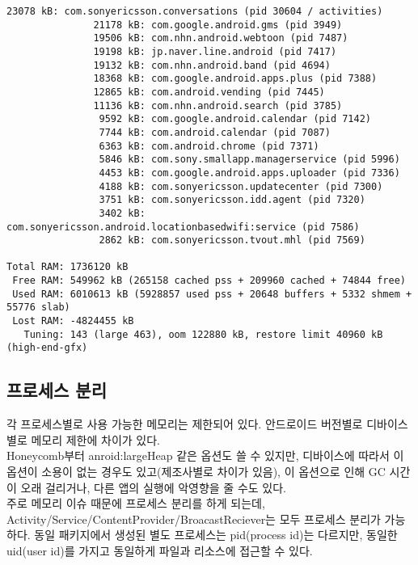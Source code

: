 \begin{lstlisting}[frame=single]
               23078 kB: com.sonyericsson.conversations (pid 30604 / activities)
               21178 kB: com.google.android.gms (pid 3949)
               19506 kB: com.nhn.android.webtoon (pid 7487)
               19198 kB: jp.naver.line.android (pid 7417)
               19132 kB: com.nhn.android.band (pid 4694)
               18368 kB: com.google.android.apps.plus (pid 7388)
               12865 kB: com.android.vending (pid 7445)
               11136 kB: com.nhn.android.search (pid 3785)
                9592 kB: com.google.android.calendar (pid 7142)
                7744 kB: com.android.calendar (pid 7087)
                6363 kB: com.android.chrome (pid 7371)
                5846 kB: com.sony.smallapp.managerservice (pid 5996)
                4453 kB: com.google.android.apps.uploader (pid 7336)
                4188 kB: com.sonyericsson.updatecenter (pid 7300)
                3751 kB: com.sonyericsson.idd.agent (pid 7320)
                3402 kB: com.sonyericsson.android.locationbasedwifi:service (pid 7586)
                2862 kB: com.sonyericsson.tvout.mhl (pid 7569)

Total RAM: 1736120 kB
 Free RAM: 549962 kB (265158 cached pss + 209960 cached + 74844 free)
 Used RAM: 6010613 kB (5928857 used pss + 20648 buffers + 5332 shmem + 55776 slab)
 Lost RAM: -4824455 kB
   Tuning: 143 (large 463), oom 122880 kB, restore limit 40960 kB (high-end-gfx)
\end{lstlisting}
         
\subsection{프로세스 분리}
각 프로세스별로 사용 가능한 메모리는 제한되어 있다. 안드로이드 버전별로 디바이스별로 메모리 제한에 차이가 있다.\\
Honeycomb부터 anroid:largeHeap 같은 옵션도 쓸 수 있지만, 디바이스에 따라서 이 옵션이 소용이 없는 경우도 있고(제조사별로 차이가 있음), 이 옵션으로 인해 GC 시간이 오래 걸리거나, 다른 앱의 실행에 악영향을 줄 수도 있다.\\ 

주로 메모리 이슈 때문에 프로세스 분리를 하게 되는데, Activity/Service/ContentProvider/BroacastReciever는 모두 프로세스 분리가 가능하다.
동일 패키지에서 생성된 별도 프로세스는 pid(process id)는 다르지만, 동일한 uid(user id)를 가지고 동일하게 파일과 리소스에 접근할 수 있다.\\

